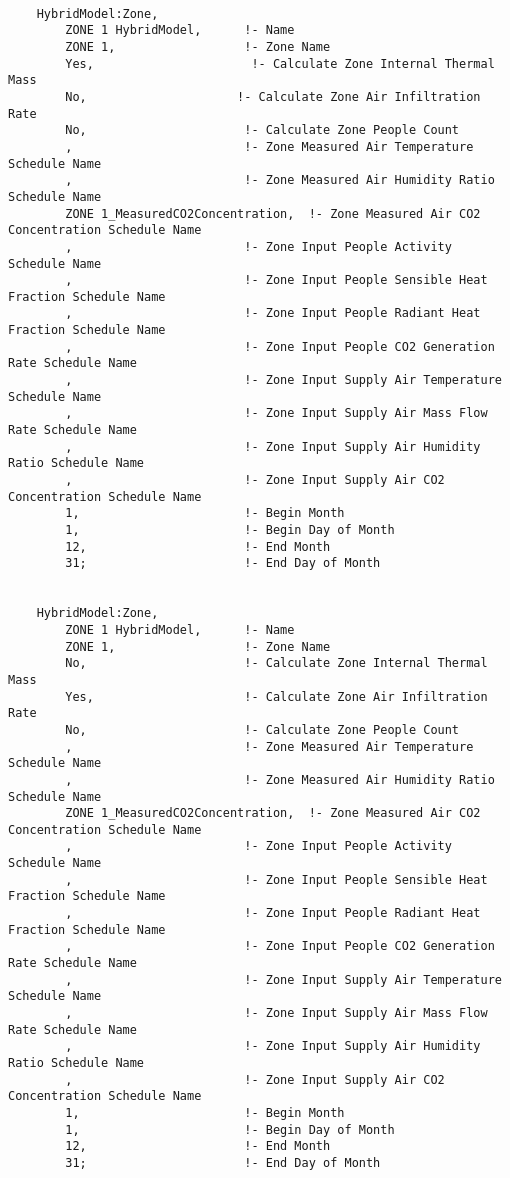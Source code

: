 \begin{lstlisting}
    
    HybridModel:Zone,
        ZONE 1 HybridModel,      !- Name
        ZONE 1,                  !- Zone Name
        Yes,                      !- Calculate Zone Internal Thermal Mass
        No,                     !- Calculate Zone Air Infiltration Rate
        No,                      !- Calculate Zone People Count
        ,                        !- Zone Measured Air Temperature Schedule Name
        ,                        !- Zone Measured Air Humidity Ratio Schedule Name
        ZONE 1_MeasuredCO2Concentration,  !- Zone Measured Air CO2 Concentration Schedule Name
        ,                        !- Zone Input People Activity Schedule Name
        ,                        !- Zone Input People Sensible Heat Fraction Schedule Name
        ,                        !- Zone Input People Radiant Heat Fraction Schedule Name
        ,                        !- Zone Input People CO2 Generation Rate Schedule Name
        ,                        !- Zone Input Supply Air Temperature Schedule Name
        ,                        !- Zone Input Supply Air Mass Flow Rate Schedule Name
        ,                        !- Zone Input Supply Air Humidity Ratio Schedule Name
        ,                        !- Zone Input Supply Air CO2 Concentration Schedule Name
        1,                       !- Begin Month
        1,                       !- Begin Day of Month
        12,                      !- End Month
        31;                      !- End Day of Month


    HybridModel:Zone,
        ZONE 1 HybridModel,      !- Name
        ZONE 1,                  !- Zone Name
        No,                      !- Calculate Zone Internal Thermal Mass
        Yes,                     !- Calculate Zone Air Infiltration Rate
        No,                      !- Calculate Zone People Count
        ,                        !- Zone Measured Air Temperature Schedule Name
        ,                        !- Zone Measured Air Humidity Ratio Schedule Name
        ZONE 1_MeasuredCO2Concentration,  !- Zone Measured Air CO2 Concentration Schedule Name
        ,                        !- Zone Input People Activity Schedule Name
        ,                        !- Zone Input People Sensible Heat Fraction Schedule Name
        ,                        !- Zone Input People Radiant Heat Fraction Schedule Name
        ,                        !- Zone Input People CO2 Generation Rate Schedule Name
        ,                        !- Zone Input Supply Air Temperature Schedule Name
        ,                        !- Zone Input Supply Air Mass Flow Rate Schedule Name
        ,                        !- Zone Input Supply Air Humidity Ratio Schedule Name
        ,                        !- Zone Input Supply Air CO2 Concentration Schedule Name
        1,                       !- Begin Month
        1,                       !- Begin Day of Month
        12,                      !- End Month
        31;                      !- End Day of Month



\end{lstlisting}
